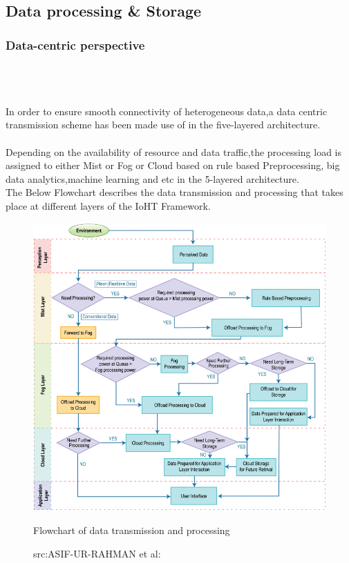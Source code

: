 \subsection{Data processing \& Storage}
\subsubsection{Data-centric perspective}\\
\hfill\\ \\
In order to ensure smooth connectivity of heterogeneous data,a data centric transmission scheme has been made use of in the five-layered architecture.\\ \\
Depending on the availability of resource and data traffic,the processing load is assigned to either Mist or Fog or Cloud based on rule based Preprocessing, big data analytics,machine learning and etc in the 5-layered architecture.\\

The Below Flowchart describes the data transmission and processing that takes place at different layers of the IoHT Framework\cite{3}.\\

\begin{figure}[H]
	\centering
	\includegraphics[width=\linewidth]{image/Datatransmission.png}
	\caption{Flowchart of data transmission and processing}
	\caption*{src:ASIF-UR-RAHMAN et al:\cite{3}}
\end{figure}

